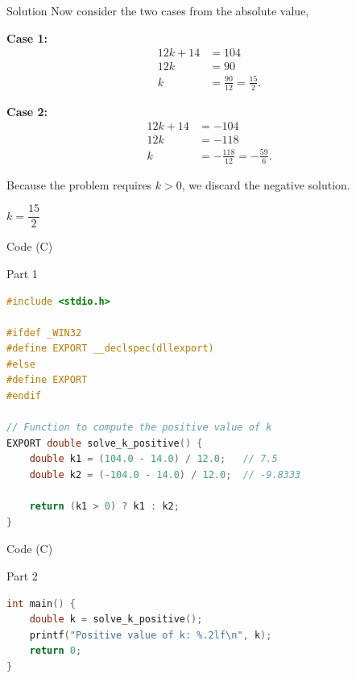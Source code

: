 \documentclass{beamer}
\begin{document}
\begin{frame}{Solution}
Now consider the two cases from the absolute value,

\textbf{Case 1:}
\begin{align}
12k+14 &= 104 \\
12k &= 90 \\
k &= \frac{90}{12} = \frac{15}{2}.
\end{align}

\textbf{Case 2:}
\begin{align}
12k+14 &= -104 \\
12k &= -118 \\
k &= -\frac{118}{12} = -\frac{59}{6}.
\end{align}

Because the problem requires \(k>0\), we discard the negative solution.
\begin{center}
$\boxed{k = \dfrac{15}{2}}$
\end{center}


\end{frame}

\begin{frame}[fragile]{ Code (C)}
\begin{block}{Part 1}
\begin{lstlisting}[language=C, basicstyle=\ttfamily\small, keywordstyle=\color{blue}, frame=single]
#include <stdio.h>

#ifdef _WIN32
#define EXPORT __declspec(dllexport)
#else
#define EXPORT
#endif

// Function to compute the positive value of k
EXPORT double solve_k_positive() {
    double k1 = (104.0 - 14.0) / 12.0;   // 7.5
    double k2 = (-104.0 - 14.0) / 12.0;  // -9.8333

    return (k1 > 0) ? k1 : k2;
}
\end{lstlisting}
\end{block}
\end{frame}

\begin{frame}[fragile]{ Code (C)}
\begin{block}{Part 2}
\begin{lstlisting}[language=C, basicstyle=\ttfamily\small, keywordstyle=\color{blue}, frame=single]
int main() {
    double k = solve_k_positive();
    printf("Positive value of k: %.2lf\n", k);
    return 0;
}
\end{lstlisting}
\end{block}
\end{frame}
\end{document}
